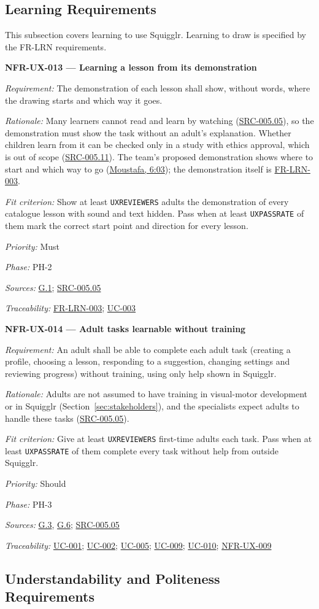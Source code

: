 \documentclass[12pt]{article}
\renewcommand{\_}{\textunderscore\allowbreak}%
\newcommand{\intlink}[3]{\hyperref[int:#1-#2]{#3}}
\newcommand{\intref}[2]{\intlink{#1}{#2}{#1, #2}}
\newcommand{\goalref}[1]{\hyperref[goal:#1]{G.#1}}
\newcommand{\ucref}[1]{\hyperref[uc:#1]{\mbox{UC-#1}}}
\newenvironment{srsrequirement}[2]{%
  \par\medskip\noindent\phantomsection\label{req:#1}%
  \textbf{#1 --- #2}\par\nobreak\smallskip }{\par\medskip}
\newcommand{\reqfield}[2]{\noindent\textit{#1:} #2\par}
\newcommand{\reqshall}[1]{\reqfield{Requirement}{#1}}
\newcommand{\reqrationale}[1]{\reqfield{Rationale}{#1}}
\newcommand{\reqfit}[1]{\reqfield{Fit criterion}{#1}}
\newcommand{\reqpriority}[1]{\reqfield{Priority}{#1}}
\newcommand{\reqphase}[1]{\reqfield{Phase}{#1}}
\newcommand{\reqsources}[1]{\reqfield{Sources}{#1}}
\newcommand{\reqtraces}[1]{\reqfield{Traceability}{#1}}
\newcommand{\reqref}[1]{\hyperref[req:#1]{#1}}
\newcommand{\srcref}[1]{\hyperref[src:#1]{SRC-#1}}
\providecommand{\ucref}[1]{\hyperref[uc:#1]{UC-#1}}
\begin{document}
\subsection{Learning Requirements}
\label{sec:ux-learning}

This subsection covers learning to use Squigglr. Learning to draw is specified
by the FR-LRN requirements.

\begin{srsrequirement}{NFR-UX-013}{Learning a lesson from its demonstration}
\reqshall{The demonstration of each lesson shall show, without words, where the
drawing starts and which way it goes.} \reqrationale{Many learners cannot read
and learn by watching (\srcref{005.05}), so the demonstration must show the task
without an adult's explanation. Whether children learn from it can be checked
only in a study with ethics approval, which is out of scope (\srcref{005.11}).
The team's proposed demonstration shows where to start and which way to go
(\intref{Moustafa}{6:03}); the demonstration itself is
\mbox{\reqref{FR-LRN-003}}.} \reqfit{Show at least \texttt{UX\_REVIEWERS} adults
the demonstration of every catalogue lesson with sound and text hidden. Pass
when at least \texttt{UX\_PASS\_RATE} of them mark the correct start point and
direction for every lesson.}
  \reqpriority{Must}
  \reqphase{PH-2}
  \reqsources{\goalref{1}; \srcref{005.05}}
  \reqtraces{\mbox{\reqref{FR-LRN-003}}; \ucref{003}}
\end{srsrequirement}

\begin{srsrequirement}{NFR-UX-014}{Adult tasks learnable without training}
\reqshall{An adult shall be able to complete each adult task (creating a
profile, choosing a lesson, responding to a suggestion, changing settings and
reviewing progress) without training, using only help shown in Squigglr.}
\reqrationale{Adults are not assumed to have training in visual-motor
development or in Squigglr (Section~\ref{sec:stakeholders}), and the specialists
expect adults to handle these tasks (\srcref{005.05}).} \reqfit{Give at least
\texttt{UX\_REVIEWERS} first-time adults each task. Pass when at least
\texttt{UX\_PASS\_RATE} of them complete every task without help from outside
Squigglr.}
  \reqpriority{Should}
  \reqphase{PH-3}
  \reqsources{\goalref{3}, \goalref{6}; \srcref{005.05}} \reqtraces{\ucref{001};
  \ucref{002}; \ucref{005}; \ucref{009}; \ucref{010}; \reqref{NFR-UX-009}}
\end{srsrequirement}

\subsection{Understandability and Politeness Requirements}
\label{sec:politeness}
\end{document}
